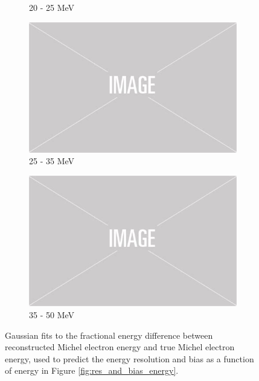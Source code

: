 \begin{figure}
\begin{subfigure}[b]{0.49\textwidth}
		\caption {20 - 25 MeV}
	\end{subfigure}
	\hfill
	\begin{subfigure}[b]{0.49\textwidth}
		\centering
		\includegraphics[width=\textwidth]{figures/placeholder.png}
		\caption {25 - 35 MeV}
	\end{subfigure}
	\begin{subfigure}[b]{0.49\textwidth}
		\centering
		\includegraphics[width=\textwidth]{figures/placeholder.png}
		\caption {35 - 50 MeV}
	\end{subfigure}

	\caption{Gaussian fits to the fractional energy difference between
		reconstructed Michel electron energy and true Michel electron energy, used 
		to predict the energy resolution and bias as a function of energy in Figure 
		\ref{fig:res_and_bias_energy}.}
	\label{fig:michel_energy_fits}

\end{figure}
